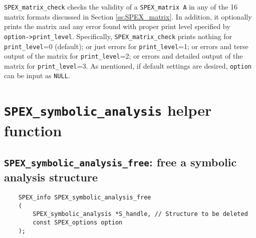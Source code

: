 \documentclass[12pt,oneside]{book}
\theoremstyle{definition}
\begin{document}
\verb|SPEX_matrix_check| checks the validity of a \verb|SPEX_matrix A| in any
of the 16 matrix formats discussed in Section \ref{ss:SPEX_matrix}.
In addition, it optionally prints the matrix and any error found with proper print level specified by
\verb|option->print_level|. Specifically, \verb|SPEX_matrix_check| prints nothing for \verb|print_level|=0 (default); or just errors for \verb|print_level|=1; or errors and terse output of the matrix for \verb|print_level|=2; or errors and detailed output of the matrix for \verb|print_level|=3.
As mentioned, if default settings are desired, \verb|option| can be input as \verb|NULL|. 


\section{\texttt{SPEX\_symbolic\_analysis} helper function} \label{s:spex_symbolic_analysis_helper}

\subsection{\texttt{SPEX\_symbolic\_analysis\_free}: free a symbolic analysis structure}
\begin{mdframed}[userdefinedwidth=\textwidth]
{\footnotesize
\begin{verbatim}
    SPEX_info SPEX_symbolic_analysis_free
    (
        SPEX_symbolic_analysis *S_handle, // Structure to be deleted
        const SPEX_options option
    ); 
\end{verbatim}
} \end{mdframed}
\end{document}
